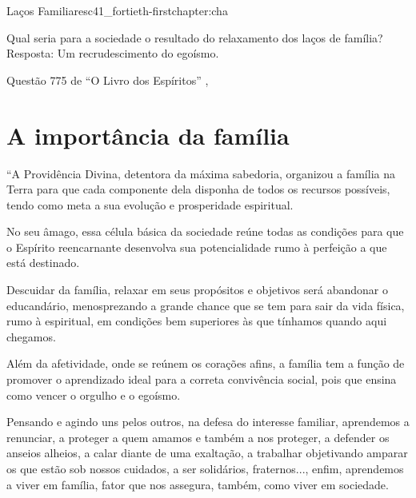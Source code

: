 \begin{chapterpage}{Laços Familiares}{c41_fortieth-firstchapter:cha}
 
\begin{myquotation}Qual seria para a sociedade o resultado do relaxamento dos laços de família? Resposta: Um recrudescimento do egoísmo.
\par\vspace*{15mm}
\mbox{}\hfill \emdash{}Questão 775 de ``O Livro dos Espíritos”
, %
\par\end{myquotation}

\end{chapterpage}



\section{A importância da família}\label{c1_basicformatting:sec}

\emdash{}``A Providência Divina, detentora da máxima sabedoria, organizou a família na Terra para que cada componente dela disponha de todos os recursos possíveis, tendo como meta a sua evolução e prosperidade espiritual.

\emdash{}No seu âmago, essa célula básica da sociedade reúne todas as condições para que o Espírito reencarnante desenvolva sua potencialidade rumo à perfeição a que está destinado.

\emdash{}Descuidar da família, relaxar em seus propósitos e objetivos será abandonar o educandário, menosprezando a grande chance que se tem para sair da vida física, rumo à espiritual, em condições bem superiores às que tínhamos quando aqui chegamos.

\emdash{}Além da afetividade, onde se reúnem os corações afins, a família tem a função de promover o aprendizado ideal para a correta convivência social, pois que ensina como vencer o orgulho e o egoísmo.

\emdash{}Pensando e agindo uns pelos outros, na defesa do interesse familiar, aprendemos a renunciar, a proteger a quem amamos e também a nos proteger, a defender os anseios alheios, a calar diante de uma exaltação, a trabalhar objetivando amparar os que estão sob nossos cuidados, a ser solidários, fraternos..., enfim, aprendemos a viver em família, fator que nos assegura, também, como viver em sociedade.

